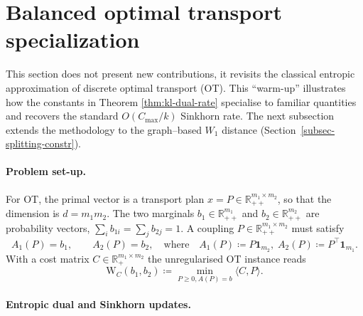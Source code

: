 \documentclass{article}
\theoremstyle{plain}
\newcommand{\eqdef}{\coloneqq}
\begin{document}
\section{Balanced optimal transport specialization}
\label{app-app:sinkhorn-ot}
\label{app-subsec:sinkh-analysis}




This section does not present new contributions, it revisits the classical entropic approximation of discrete optimal transport (OT). 
This ``warm-up'' illustrates how the constants in Theorem \ref{thm:kl-dual-rate} specialise to familiar quantities and recovers the standard $O(C_{\max}/k)$ Sinkhorn rate.  
The next subsection extends the methodology to the graph--based $W_{1}$ distance (Section~\ref{subsec-splitting-constr}).

\paragraph{Problem set-up.}

For OT, the primal vector is a transport plan $x = P \in\mathbb{R}_{++}^{m_1\times m_2}$, so that the dimension is $d=m_1 m_2$. The two marginals $b_1\in\mathbb{R}_{++}^{m_1}$ and $b_2\in\mathbb{R}_{++}^{m_2}$ are probability vectors, $\sum_i b_{1i}=\sum_j b_{2j}=1$.  
A coupling $P\in\mathbb{R}_{++}^{m_1\times m_2}$ must satisfy
\[
   A_1(P) = b_1,
   \qquad
   A_2(P) = b_2,
   \quad\text{where}\quad
   A_1(P)\coloneqq P\mathbf 1_{m_2},
   \;
   A_2(P)\coloneqq P^{\!\top}\mathbf 1_{m_1}.
\]
With a cost matrix $C\in\mathbb{R}_+^{m_1\times m_2}$ the unregularised OT instance reads
\begin{equation}\label{app-eq:ot-distance}
   \mathrm W_{C}(b_1,b_2) \eqdef 
   \min_{P \ge 0, A(P)=b}
        \langle C,P\rangle .
\end{equation}

\paragraph{Entropic dual and Sinkhorn updates.}
\end{document}
